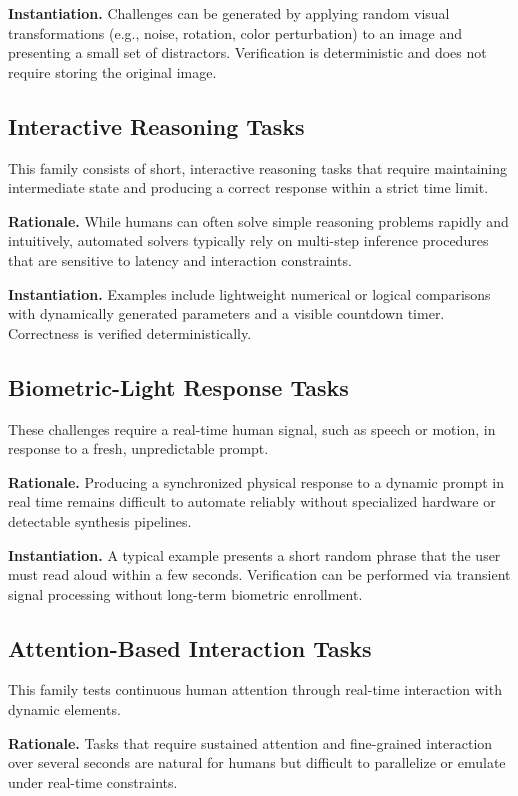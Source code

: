 \documentclass[11pt]{article}
\begin{document}
\textbf{Instantiation.}
Challenges can be generated by applying random visual transformations (e.g., noise, rotation, color perturbation) to an image and presenting a small set of distractors. Verification is deterministic and does not require storing the original image.

\subsection{Interactive Reasoning Tasks}

This family consists of short, interactive reasoning tasks that require maintaining intermediate state and producing a correct response within a strict time limit.

\textbf{Rationale.}
While humans can often solve simple reasoning problems rapidly and intuitively, automated solvers typically rely on multi-step inference procedures that are sensitive to latency and interaction constraints.

\textbf{Instantiation.}
Examples include lightweight numerical or logical comparisons with dynamically generated parameters and a visible countdown timer. Correctness is verified deterministically.

\subsection{Biometric-Light Response Tasks}

These challenges require a real-time human signal, such as speech or motion, in response to a fresh,
unpredictable prompt.


\textbf{Rationale.}
Producing a synchronized physical response to a dynamic prompt in real time remains difficult to automate reliably without specialized hardware or detectable synthesis pipelines.

\textbf{Instantiation.}
A typical example presents a short random phrase that the user must read aloud within a few seconds. Verification can be performed via transient signal processing without long-term biometric enrollment.

\subsection{Attention-Based Interaction Tasks}

This family tests continuous human attention through real-time interaction with dynamic elements.

\textbf{Rationale.}
Tasks that require sustained attention and fine-grained interaction over several seconds are natural for humans but difficult to parallelize or emulate under real-time constraints.
\end{document}
